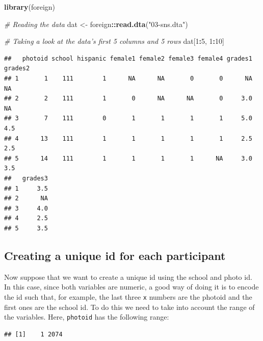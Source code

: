 \documentclass[]{book}
\newenvironment{Shaded}{\begin{snugshade}}{\end{snugshade}}
\newcommand{\KeywordTok}[1]{\textcolor[rgb]{0.13,0.29,0.53}{\textbf{#1}}}
\newcommand{\DecValTok}[1]{\textcolor[rgb]{0.00,0.00,0.81}{#1}}
\newcommand{\StringTok}[1]{\textcolor[rgb]{0.31,0.60,0.02}{#1}}
\newcommand{\CommentTok}[1]{\textcolor[rgb]{0.56,0.35,0.01}{\textit{#1}}}
\newcommand{\OperatorTok}[1]{\textcolor[rgb]{0.81,0.36,0.00}{\textbf{#1}}}
\newcommand{\NormalTok}[1]{#1}
\theoremstyle{definition}
\theoremstyle{definition}
\theoremstyle{definition}
\theoremstyle{remark}
\begin{document}
\begin{Shaded}
\begin{Highlighting}[]
\KeywordTok{library}\NormalTok{(foreign)}

\CommentTok{# Reading the data}
\NormalTok{dat <-}\StringTok{ }\NormalTok{foreign}\OperatorTok{::}\KeywordTok{read.dta}\NormalTok{(}\StringTok{"03-sns.dta"}\NormalTok{)}

\CommentTok{# Taking a look at the data's first 5 columns and 5 rows}
\NormalTok{dat[}\DecValTok{1}\OperatorTok{:}\DecValTok{5}\NormalTok{, }\DecValTok{1}\OperatorTok{:}\DecValTok{10}\NormalTok{]}
\end{Highlighting}
\end{Shaded}

\begin{verbatim}
##   photoid school hispanic female1 female2 female3 female4 grades1 grades2
## 1       1    111        1      NA      NA       0       0      NA      NA
## 2       2    111        1       0      NA      NA       0     3.0      NA
## 3       7    111        0       1       1       1       1     5.0     4.5
## 4      13    111        1       1       1       1       1     2.5     2.5
## 5      14    111        1       1       1       1      NA     3.0     3.5
##   grades3
## 1     3.5
## 2      NA
## 3     4.0
## 4     2.5
## 5     3.5
\end{verbatim}

\subsection{Creating a unique id for each
participant}\label{creating-a-unique-id-for-each-participant}

Now suppose that we want to create a unique id using the school and
photo id. In this case, since both variables are numeric, a good way of
doing it is to encode the id such that, for example, the last three
\texttt{x} numbers are the photoid and the first ones are the school id.
To do this we need to take into account the range of the variables.
Here, \texttt{photoid} has the following range:

\begin{Shaded}
\end{Shaded}

\begin{verbatim}
## [1]    1 2074
\end{verbatim}
\end{document}
